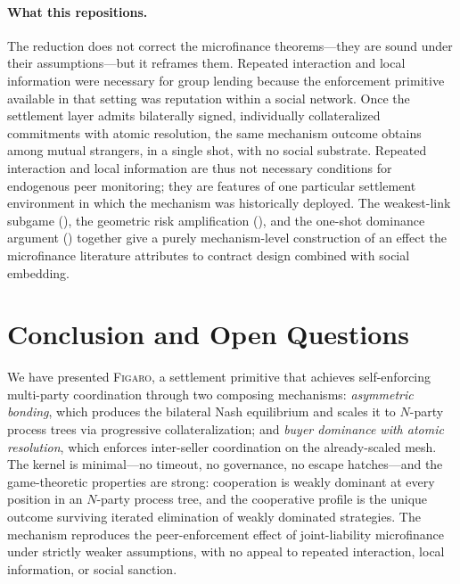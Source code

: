 \documentclass[11pt,a4paper]{article}
\theoremstyle{definition}
\theoremstyle{remark}
\newcommand{\figaro}{\textsc{Figaro}}
\begin{document}
\paragraph{What this repositions.}
The reduction does not correct the microfinance theorems---they are
sound under their assumptions---but it reframes them. Repeated
interaction and local information were necessary for group lending
because the enforcement primitive available in that setting was
reputation within a social network. Once the settlement layer admits
bilaterally signed, individually collateralized commitments with
atomic resolution, the same mechanism outcome obtains among mutual
strangers, in a single shot, with no social substrate. Repeated
interaction and local information are thus not necessary conditions
for endogenous peer monitoring; they are features of one particular
settlement environment in which the mechanism was historically
deployed. The weakest-link subgame (),
the geometric risk amplification (), and
the one-shot dominance argument () together
give a purely mechanism-level construction of an effect the
microfinance literature attributes to contract design combined with
social embedding.

\section{Conclusion and Open Questions}
\label{sec:conclusion}

We have presented \figaro{}, a settlement primitive that achieves
self-enforcing multi-party coordination through two composing
mechanisms: \emph{asymmetric bonding}, which produces the bilateral
Nash equilibrium and scales it to $N$-party process trees via
progressive collateralization; and \emph{buyer dominance with atomic
resolution}, which enforces inter-seller coordination on the
already-scaled mesh. The kernel is minimal---no timeout, no
governance, no escape hatches---and the game-theoretic properties are
strong: cooperation is weakly dominant at every position in an
$N$-party process tree, and the cooperative profile is the unique
outcome surviving iterated elimination of weakly dominated strategies.
The mechanism reproduces the peer-enforcement effect of joint-liability
microfinance under strictly weaker assumptions, with no appeal to
repeated interaction, local information, or social sanction.
\end{document}
